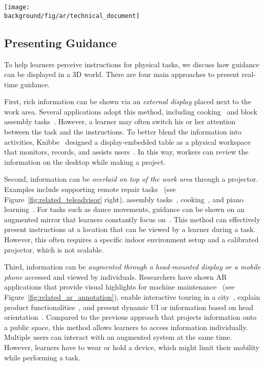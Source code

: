 \begin{figure*}[t!]
  \centering
  \texttt{[image: \\background/fig/ar/technical\_document]}
  \caption{Work by Mohr \ea{}~\cite{Mohr:2015:RTD:2702123.2702490} automatically analyzes a technical document and augments a machine with AR animations in 3D to help novices operate an unfamiliar machine.}
  \label{fig:related_ar_annotation}
\end{figure*}

\subsection{Presenting Guidance}
To help learners perceive instructions for physical tasks, we discuss how guidance can be displayed in a 3D world. There are four main approaches to present real-time guidance.

First, rich information can be shown via an \emph{external display} placed next to the work area. Several applications adopt this method, including cooking~\cite{Uriu:2012:PRM:2207676.2207695} and block assembly tasks~\cite{Gupta2012DuploTrack,Wu:2016:ARI:2856400.2856416}. However, a learner may often switch his or her attention between the task and the instructions. To better blend the information into activities, Knibbe~\ea{} designed a display-embedded table as a physical workspace that monitors, records, and assists users~\cite{Knibbe:2015:SMI:2817721.2817741}. In this way, workers can review the information on the desktop while making a project.

Second, information can be \emph{overlaid on top of the work area} through a projector. Examples include supporting remote repair tasks~\cite{Gurevich:2012ko} (see Figure~\ref{fig:related_teleadvisor} right), assembly tasks~\cite{Kirk:2006:CRG:1124772.1124951}, cooking~\cite{Ju:2001:CIC:634067.634227}, and piano learning~\cite{Xiao:2016:IEI:2858036.2858577}.
%
For tasks such as dance movements, guidance can be shown on an augmented mirror that learners constantly focus on~\cite{Anderson:2013:YEM:2501988.2502045}.
%
This method can effectively present instructions at a location that can be viewed by a learner during a task. However, this often requires a specific indoor environment setup and a calibrated projector, which is not scalable.

Third, information can be \emph{augmented through a head-mounted display or a mobile phone} accessed and viewed by individuals. Researchers have shown AR applications that provide visual highlights for machine maintenance~\cite{Henderson:2011ff,Mohr:2015:RTD:2702123.2702490} (see Figure~\ref{fig:related_ar_annotation}), enable interactive touring in a city~\cite{Feiner1997}, explain product functionalities~\cite{MagicLens}, and present dynamic UI or information based on head orientation~\cite{Zhang:2014:HHO:2659766.2659773}.
%
Compared to the previous approach that projects information onto a public space, this method allows learners to access information individually. Multiple users can interact with an augmented system at the same time. However, learners have to wear or hold a device, which might limit their mobility while performing a task.

